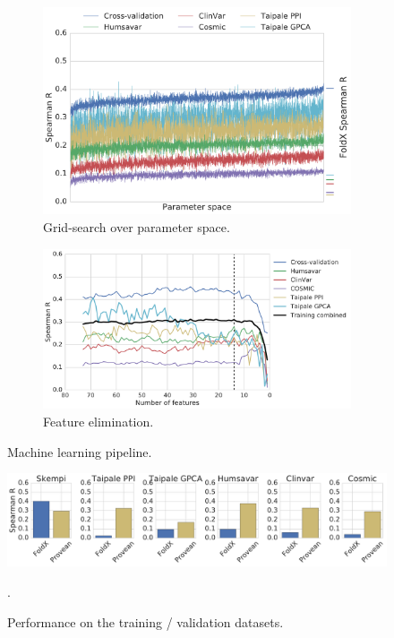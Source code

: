 \begin{figure}[h]
	\begin{subfigure}[b]{0.6\textwidth}
		\includegraphics[width=1\linewidth]{static/elaspic_training_set/interface_machine_learning/gridsearch.pdf}
		\caption{Grid-search over parameter space.}
		\label{fig:Ng1}
	\end{subfigure}

	\begin{subfigure}[b]{0.75\textwidth}
		\includegraphics[width=1\linewidth]{static/elaspic_training_set/interface_machine_learning/feature_elimination.pdf}
		\caption{Feature elimination.}
		\label{fig:Ng1}
	\end{subfigure}

	\caption{Machine learning pipeline.}
\end{figure}



\begin{figure}[h]
	\centering
	\includegraphics[width=1.0\linewidth]{static/elaspic_training_set/interface_data_statistics/initial_performance.pdf}
	\caption{Performance on the training / validation datasets.}.
\end{figure}

